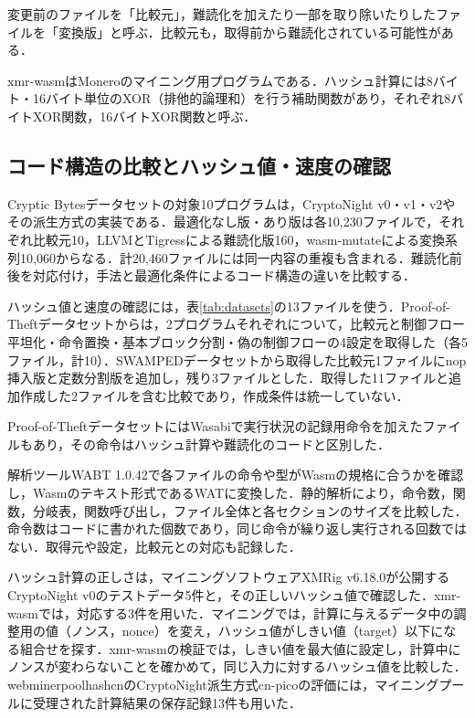 \documentclass[submit,techrep]{ipsj}
\begin{document}
変更前のファイルを「比較元」，難読化を加えたり一部を取り除いたりしたファイルを「変換版」と呼ぶ．比較元も，取得前から難読化されている可能性がある．

xmr-wasmはMoneroのマイニング用プログラムである\cite{sermchaiwong2026}．ハッシュ計算には8バイト・16バイト単位のXOR（排他的論理和）を行う補助関数があり，それぞれ8バイトXOR関数，16バイトXOR関数と呼ぶ．

\subsection{コード構造の比較とハッシュ値・速度の確認}
Cryptic Bytesデータセットの対象10プログラムは，CryptoNight v0・v1・v2やその派生方式の実装である．最適化なし版・あり版は各10,230ファイルで，それぞれ比較元10，LLVMとTigressによる難読化版160，wasm-mutateによる変換系列10,060からなる．計20,460ファイルには同一内容の重複も含まれる．難読化前後を対応付け，手法と最適化条件によるコード構造の違いを比較する．

ハッシュ値と速度の確認には，表\ref{tab:datasets}の13ファイルを使う．Proof-of-Theftデータセットからは，2プログラムそれぞれについて，比較元と制御フロー平坦化・命令置換・基本ブロック分割・偽の制御フローの4設定を取得した（各5ファイル，計10）．SWAMPEDデータセットから取得した比較元1ファイルにnop挿入版と定数分割版を追加し，残り3ファイルとした．取得した11ファイルと追加作成した2ファイルを含む比較であり，作成条件は統一していない．

Proof-of-TheftデータセットにはWasabiで実行状況の記録用命令を加えたファイルもあり，その命令はハッシュ計算や難読化のコードと区別した．

解析ツールWABT 1.0.42で各ファイルの命令や型がWasmの規格に合うかを確認し，Wasmのテキスト形式であるWATに変換した．静的解析により，命令数，関数，分岐表，関数呼び出し，ファイル全体と各セクションのサイズを比較した．命令数はコードに書かれた個数であり，同じ命令が繰り返し実行される回数ではない．取得元や設定，比較元との対応も記録した．

ハッシュ計算の正しさは，マイニングソフトウェアXMRig v6.18.0が公開するCryptoNight v0のテストデータ5件と，その正しいハッシュ値で確認した\cite{xmrigvectors}．xmr-wasmでは，対応する3件を用いた．マイニングでは，計算に与えるデータ中の調整用の値（ノンス，nonce）を変え，ハッシュ値がしきい値（target）以下になる組合せを探す．xmr-wasmの検証では，しきい値を最大値に設定し，計算中にノンスが変わらないことを確かめて，同じ入力に対するハッシュ値を比較した．webminerpoolhashcnのCryptoNight派生方式cn-picoの評価には，マイニングプールに受理された計算結果の保存記録13件も用いた．
\end{document}
